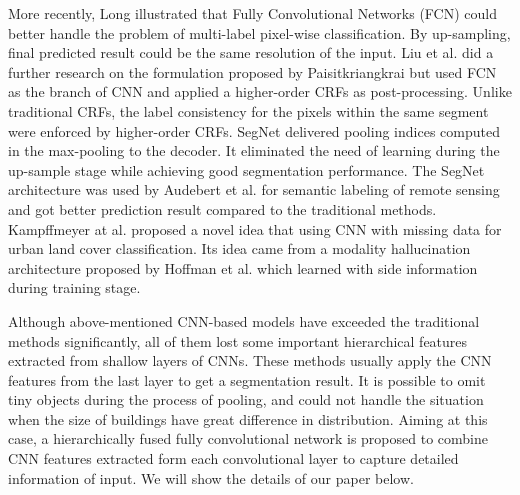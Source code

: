 \setlength{\parindent}{2ex}More recently, Long \cite{IEEEexample:Long_2015_CVPR} illustrated that Fully Convolutional Networks (FCN) could better handle the problem of multi-label pixel-wise classification. By up-sampling, final predicted result could be the same resolution of the input. Liu et al. \cite{IEEEexample:liu2017dense} did a further research on the formulation proposed by Paisitkriangkrai \cite{IEEEexample:paisitkriangkrai2015effective} but used FCN as the branch of CNN and applied a higher-order CRFs as post-processing. Unlike traditional CRFs, the label consistency for the pixels within the same segment were enforced by higher-order CRFs. SegNet \cite{IEEEexample:badrinarayanan2017segnet} delivered pooling indices computed in the max-pooling to the decoder. It eliminated the need of learning during the up-sample stage while achieving good segmentation performance. The SegNet architecture was used by Audebert et al. \cite{IEEEexample:audebert2017deep} for semantic labeling of remote sensing and got better prediction result compared to the traditional methods. Kampffmeyer at al. \cite{IEEEexample:kampffmeyer2017urban} proposed a novel idea that using CNN with missing data for urban land cover classification. Its idea came from a modality hallucination architecture proposed by Hoffman et al. \cite{IEEEexample:hoffman2016learning} which learned with side information during training stage.\par

Although above-mentioned CNN-based models have exceeded the traditional methods significantly, all of them lost some important hierarchical features extracted from shallow layers of CNNs. These methods usually apply the CNN features from the last layer to get a segmentation result. It is possible to omit tiny objects during the process of pooling, and could not handle the situation when the size of buildings have great difference in distribution. Aiming at this case, a hierarchically fused fully convolutional network is proposed to combine CNN features extracted form each convolutional layer to capture detailed information of input. We will show the details of our paper below. 